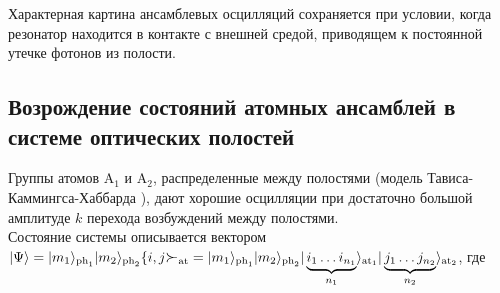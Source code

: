 \clearpage
Характерная картина ансамблевых осцилляций сохраняется при условии, когда резонатор находится в контакте с внешней средой, приводящем к постоянной утечке фотонов из полости.
\begin{figure}[h!]
	\noindent{}
\end{figure}

\subsection{Возрождение состояний атомных ансамблей в системе оптических полостей}
\vspace{-2em}
Группы атомов $\mathrm{A}_1$ и $\mathrm{A}_2$, распределенные между полостями (модель Тависа-Каммингса-Хаббарда \cite{tch_photon_blockade,tch_transfer,tch_quality}), дают хорошие осцилляции при достаточно большой амплитуде $k$ перехода возбуждений между полостями. 
\\[12pt]
\noindent Состояние системы описывается вектором\\
$|\Psi\ra=|m_1\ra_{\mathrm{ph}_\mathrm{1}}|m_2\ra_{\mathrm{ph}_{\mathrm{2}}}\{i, j\Succ_{\mathrm{at}} = |m_1\ra_{\mathrm{ph}_\mathrm{1}}|m_2\ra_{\mathrm{ph}_{\mathrm{2}}}|\protect\underbrace{i_1 \dots i_{n_1}}_{n_1}\ra_{\mathrm{at_1}}|\protect\underbrace{j_1 \dots j_{n_2}}_{n_2}\ra_{\mathrm{at_2}}$, где

